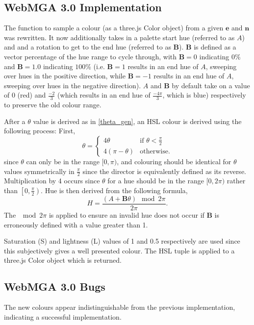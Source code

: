 \subsection{WebMGA 3.0 Implementation}
\label{colour_dir_impl}
The function to sample a colour (as a three.js Color object) from a given $\mathbf{e}$ and $\mathbf{n}$ was rewritten. It now additionally takes in a palette start hue (referred to as $A$) and and a rotation to get to the end hue (referred to as $\mathbf{B}$). $\mathbf{B}$ is defined as a vector percentage of the hue range to cycle through, with $\mathbf{B}=0$ indicating $0\%$ and $\mathbf{B}=1.0$ indicating $100\%$ (i.e. $\mathbf{B}=1$ results in an end hue of $A$, sweeping over hues in the positive direction, while $\mathbf{B}=-1$ results in an end hue of $A$, sweeping over hues in the negative direction). $A$ and $\mathbf{B}$ by default take on a value of $0$ (red) and $\frac{-2}{3}$ (which results in an end hue of $\frac{-4\pi}{3}$, which is blue) respectively to preserve the old colour range.

After a $\theta$ value is derived as in \cref{theta_gen}, an HSL colour is derived using the following process: First,
\begin{equation}
\theta=\begin{cases}
  4\theta &\text{if } \theta<\frac{\pi}{2}\\
  4(\pi-\theta)&\text{otherwise.}
\end{cases}
\end{equation}
since $\theta$ can only be in the range $[0, \pi)$, and colouring should be identical for $\theta$ values symmetrically in $\frac{\pi}{2}$ since the director is equivalently defined as its reverse. Multiplication by 4 occurs since $\theta$ for a hue should be in the range $[0, 2\pi)$ rather than $\left[0, \frac{\pi}{2}\right)$. Hue is then derived from the following formula,
\begin{equation}
H=\frac{(A+\mathbf{B}\theta) \mod 2\pi}{2\pi}.
\end{equation}
The $\mod 2\pi$ is applied to ensure an invalid hue does not occur if $\mathbf{B}$ is erroneously defined with a value greater than 1.

Saturation (S) and lightness (L) values of 1 and 0.5 respectively are used since this subjectively gives a well presented colour. The HSL tuple is applied to a three.js Color object which is returned.

\subsection{WebMGA 3.0 Bugs}
The new colours appear indistinguishable from the previous implementation, indicating a successful implementation.
